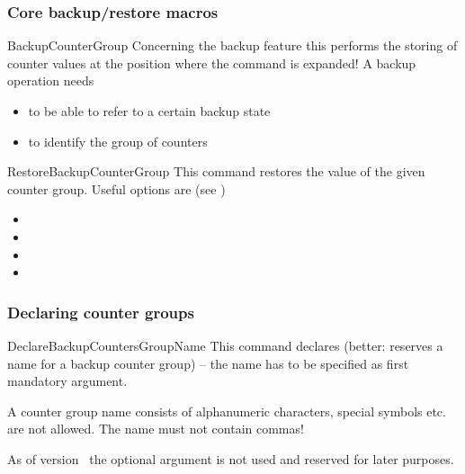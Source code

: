 \documentclass[12pt,a4paper,oneside]{article}
\makeatletter
\newcommand{\chdocextractversion}[1]{%
  \@nameuse{#1}%
}
\newcommand{\CHDocNew}[1]{%
  \tcbdocmarginnote[doclang/new={N},
  colframe=blue,
  halign=left,
  colback={blue!20!white},
  fontupper={\tiny}
  ]{%
    \chdocextractversion{xassoccntversion#1}%
  }%
}
\def\packageversion{\xassoccntpackageversion}%
\makeatother
\begin{document}
\subsubsection{Core backup/restore macros}

\begin{docCommand}[before={\CHDocNew{1.0}}]{BackupCounterGroup}{}
  Concerning the backup feature this performs the storing of counter values at the position where the command is expanded!
  A backup operation needs 
  \begin{itemize}
    \item {} to be able to refer to a certain backup state
    \item {} to identify the group of counters
  \end{itemize}
\end{docCommand}

\begin{docCommand}[before={\CHDocNew{1.0}}]{RestoreBackupCounterGroup}{}
  This command restores the value of the given counter group. 
  Useful options are (see )
  \begin{itemize}
    \item {}
    \item {}
    \item {}
    \item {}
    \end{itemize}
\end{docCommand}


\subsubsection{Declaring counter groups}

\begin{docCommand}[before={\CHDocNew{1.0}}]{DeclareBackupCountersGroupName}{\oarg{}}
  This command declares (better: reserves a name for a backup counter group) -- the name has to be specified as first mandatory argument. 

  A counter group name consists of alphanumeric characters, special symbols etc. are not allowed. The name must not contain commas!
  
  As of version \packageversion\ the optional argument is not used and reserved for later purposes. 
\end{docCommand}
\end{document}
